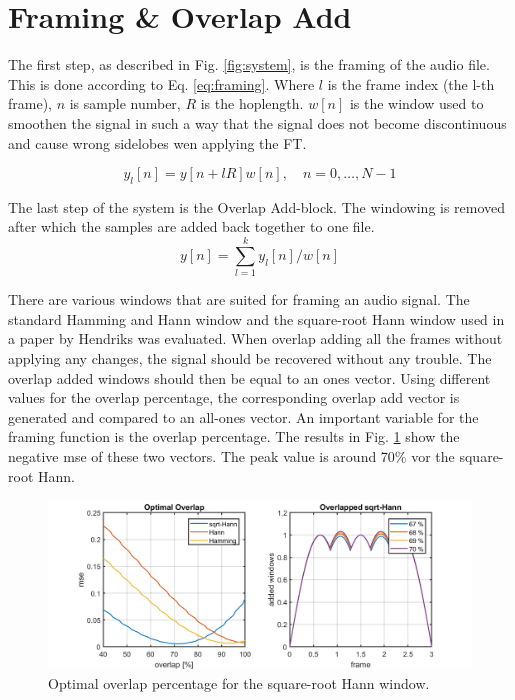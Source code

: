 \section{Framing \& Overlap Add} \label{sec:framing_overlap_add}

The first step, as described in Fig. \ref{fig:system}, is the framing of the audio file. This is done according to Eq. \ref{eq:framing}. Where $l$ is the frame index (the l-th frame), $n$ is sample number, $R$ is the hoplength. $w[n]$ is the window used to smoothen the signal in such a way that the signal does not become discontinuous and cause wrong sidelobes wen applying the FT.

\begin{equation}
  \label{eq:framing}
  y_{l}[n] = y[n + lR]w[n],\quad n=0,\hdots,N-1
\end{equation}

The last step of the system is the Overlap Add-block. The windowing is removed after which the samples are added back together to one file.
\begin{equation}
  \label{eq:overlap_add}
  y[n] =  \sum_{l=1}^{k} y_{l}[n]/w[n]
\end{equation}

There are various windows that are suited for framing an audio signal. The standard Hamming and Hann window and the square-root Hann window used in a paper by Hendriks\cite{Hendriks} was evaluated. When overlap adding all the frames without applying any changes, the signal should be recovered without any trouble. The overlap added windows should then be equal to an ones vector. Using different values for the overlap percentage, the corresponding overlap add vector is generated and compared to an all-ones vector. An important variable for the framing function is the overlap percentage.  The results in Fig. \ref{fig:opt_oa} show the negative mse of these two vectors. The peak value is around 70\% vor the square-root Hann.

\begin{figure}[h]
  \includegraphics[width=\textwidth]{images/optimal_overlap.png}
  \caption{Optimal overlap percentage for the square-root Hann window.}
  \label{fig:opt_oa}
\end{figure}
